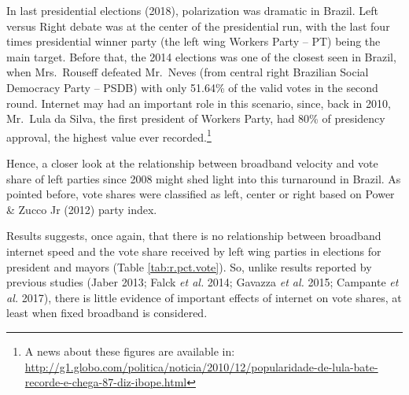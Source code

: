 \documentclass[
  12pt,
]{article}
\begin{document}
In last presidential elections (2018), polarization was dramatic in
Brazil. Left versus Right debate was at the center of the presidential
run, with the last four times presidential winner party (the left wing
Workers Party -- PT) being the main target. Before that, the 2014
elections was one of the closest seen in Brazil, when Mrs.~Rouseff
defeated Mr.~Neves (from central right Brazilian Social Democracy Party
-- PSDB) with only 51.64\% of the valid votes in the second round.
Internet may had an important role in this scenario, since, back in
2010, Mr.~Lula da Silva, the first president of Workers Party, had 80\%
of presidency approval, the highest value ever recorded.\footnote{A news
  about these figures are available in:
  \url{http://g1.globo.com/politica/noticia/2010/12/popularidade-de-lula-bate-recorde-e-chega-87-diz-ibope.html}}

Hence, a closer look at the relationship between broadband velocity and
vote share of left parties since 2008 might shed light into this
turnaround in Brazil. As pointed before, vote shares were classified as
left, center or right based on Power \& Zucco Jr (2012) party index.

Results suggests, once again, that there is no relationship between
broadband internet speed and the vote share received by left wing
parties in elections for president and mayors (Table
\ref{tab:r.pct.vote}). So, unlike results reported by previous studies
(Jaber 2013; Falck \emph{et al.} 2014; Gavazza \emph{et al.} 2015;
Campante \emph{et al.} 2017), there is little evidence of important
effects of internet on vote shares, at least when fixed broadband is
considered.
\end{document}
